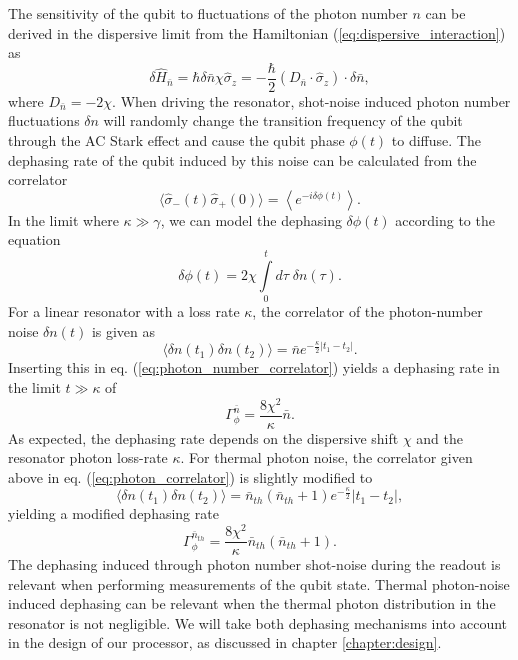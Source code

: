 The sensitivity of the qubit to fluctuations of the photon number $n$ can be derived in the dispersive limit from the Hamiltonian (\ref{eq:dispersive_interaction}) as
%
\begin{equation}
\delta \hat{H}_{\bar{n}}=\hbar\delta\bar{n}\chi\hat{\sigma}_z = -\frac{\hbar}{2}\left(D_{\bar{n}}\cdot\hat{\sigma}_z\right)\cdot \delta \bar{n},
\end{equation}
%
where $D_{\bar{n}}=-2\chi$. When driving the resonator, shot-noise induced photon number fluctuations $\delta n$ will randomly change the transition frequency of the qubit through the AC Stark effect and cause the qubit phase $\phi(t)$ to diffuse. The dephasing rate of the qubit induced by this noise can be calculated from the correlator
%
\begin{equation}
\langle \hat{\sigma}_-(t)\hat{\sigma}_+(0)\rangle = \left\langle e^{-i\delta \phi(t)}\right\rangle. \label{eq:photon_number_correlator}
\end{equation}
%
In the limit where $\kappa\gg \gamma$, we can model the dephasing $\delta \phi(t)$ according to the equation
%
\begin{equation}
\delta \phi(t) = 2\chi\int\limits_0^t d\tau \; \delta n(\tau).
\end{equation}
%
For a linear resonator with a loss rate $\kappa$, the correlator of the photon-number noise $\delta n(t)$ is given as
%
\begin{equation}
\langle \delta n (t_1)\delta n (t_2) \rangle = \bar{n}e^{-\frac{\kappa}{2}|t_1-t_2|}. \label{eq:photon_correlator}
\end{equation}
%
Inserting this in eq. (\ref{eq:photon_number_correlator}) yields a dephasing rate in the limit $t \gg \kappa$ of
%
\begin{equation}
\Gamma_\phi^{\bar{n}} = \frac{8\chi^2}{\kappa}\bar{n}. \label{eq:photon_number_dephasing_rate}
\end{equation}
%
As expected, the dephasing rate depends on the dispersive shift $\chi$ and the resonator photon loss-rate $\kappa$. For thermal photon noise, the correlator given above in eq. (\ref{eq:photon_correlator}) is slightly modified to
%
\begin{equation}
\langle \delta n(t_1)\delta n (t_2)\rangle = \bar{n}_{th}(\bar{n}_{th}+1)e^{-\frac{\kappa}{2}}|t_1-t_2|,
\end{equation}
%
yielding a modified dephasing rate
%
\begin{equation}
\Gamma_\phi^{\bar{n}_{th}} = \frac{8\chi^2}{\kappa}\bar{n}_{th}(\bar{n}_{th}+1). \label{eq:thermal_photon_number_dephasing_rate}
\end{equation}
%
The dephasing induced through photon number shot-noise during the readout is relevant when performing measurements of the qubit state. Thermal photon-noise induced dephasing can be relevant when the thermal photon distribution in the resonator is not negligible. We will take both dephasing mechanisms into account in the design of our processor, as discussed in chapter \ref{chapter:design}.

